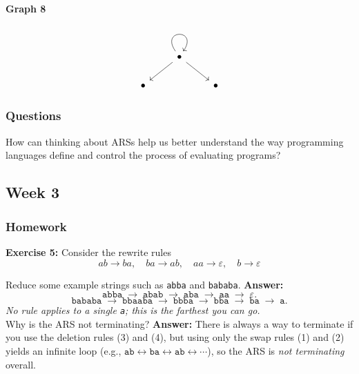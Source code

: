 \documentclass{article}
\theoremstyle{theorem}
\theoremstyle{definition}
\theoremstyle{remark}
\begin{document}
\paragraph{Graph 8}
\[\begin{tikzcd}
	& \bullet \\
	\bullet && \bullet
	\arrow[from=1-2, to=1-2, loop, in=55, out=125, distance=10mm]
	\arrow[from=1-2, to=2-1]
	\arrow[from=1-2, to=2-3]
\end{tikzcd}\]



\subsubsection{Questions}

How can thinking about ARSs help us better understand the way programming languages define and control the process of evaluating programs?

\subsection{Week 3}

\subsubsection{Homework}

\textbf{Exercise 5:} Consider the rewrite rules
\[
ab \to ba, \quad ba \to ab, \quad aa \to \varepsilon, \quad b \to \varepsilon
\]

Reduce some example strings such as \texttt{abba} and \texttt{bababa}.  
\textbf{Answer:} 
\[
\texttt{abba} \;\to\; \texttt{abab} \;\to\; \texttt{aba} \;\to\; \texttt{aa} \;\to\; \varepsilon.
\]
\[
\texttt{bababa} \;\to\; \texttt{bbaaba} \;\to\; \texttt{bbba} \;\to\; \texttt{bba} \;\to\; \texttt{ba} \;\to\; \texttt{a}.
\]
\emph{No rule applies to a single \texttt{a}; this is the farthest you can go.}\\[1em]

Why is the ARS not terminating?  
\textbf{Answer:} There is always a way to terminate if you use the deletion rules (3) and (4), but using only the swap rules (1) and (2) yields an infinite loop (e.g., \(\texttt{ab} \leftrightarrow \texttt{ba} \leftrightarrow \texttt{ab} \leftrightarrow \cdots\)), so the ARS is \emph{not terminating} overall.\\[1em]
\end{document}
